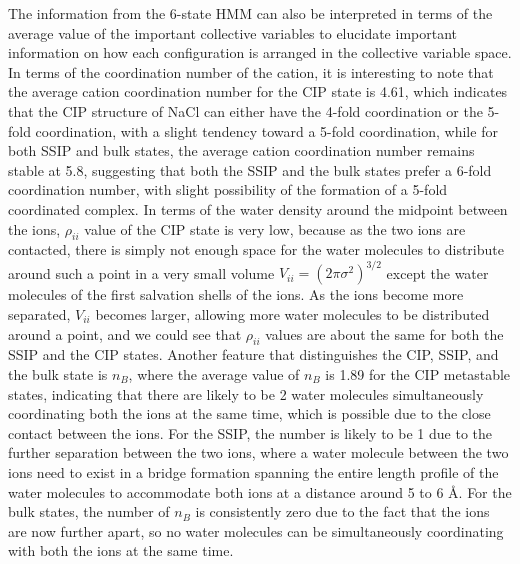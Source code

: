 \begin{spacing}{2.0}
    The information from the 6-state HMM can also be interpreted in terms of the average value of the important collective variables to elucidate 
    important information on how each configuration is arranged in the collective variable space. In terms of the coordination number of the cation, 
    it is interesting to note that the average cation coordination number for the CIP state is 4.61, which indicates that the CIP structure of NaCl 
    can either have the 4-fold coordination or the 5-fold coordination, with a slight tendency toward a 5-fold coordination, while for both SSIP 
    and bulk states, the average cation coordination number remains stable at 5.8, suggesting that both the SSIP and the bulk states prefer a 6-fold 
    coordination number, with slight possibility of the formation of a 5-fold coordinated complex. In terms of the water density around the midpoint 
    between the ions, $\rho_{ii}$ value of the CIP state is very low, because as the two ions are contacted, there is simply not enough space for 
    the water molecules to distribute around such a point in a very small volume $V_{ii} = (2\pi\sigma^2)^{3/2}$ except the water molecules of the 
    first salvation shells of the ions. As the ions become more separated, $V_{ii}$ becomes larger, allowing more water molecules to be distributed 
    around a point, and we could see that $\rho_{ii}$ values are about the same for both the SSIP and the CIP states. Another feature that 
    distinguishes the CIP, SSIP, and the bulk state is $n_B$, where the average value of $n_B$ is 1.89 for the CIP metastable states, indicating 
    that there are likely to be 2 water molecules simultaneously coordinating both the ions at the same time, which is possible due to the close 
    contact between the ions. For the SSIP, the number is likely to be 1 due to the further separation between the two ions, where a water molecule 
    between the two ions need to exist in a bridge formation spanning the entire length profile of the water molecules to accommodate both ions at 
    a distance around 5 to 6 \r{A}. For the bulk states, the number of $n_B$ is consistently zero due to the fact that the ions are now further apart, 
    so no water molecules can be simultaneously coordinating with both the ions at the same time.


\end{spacing}
